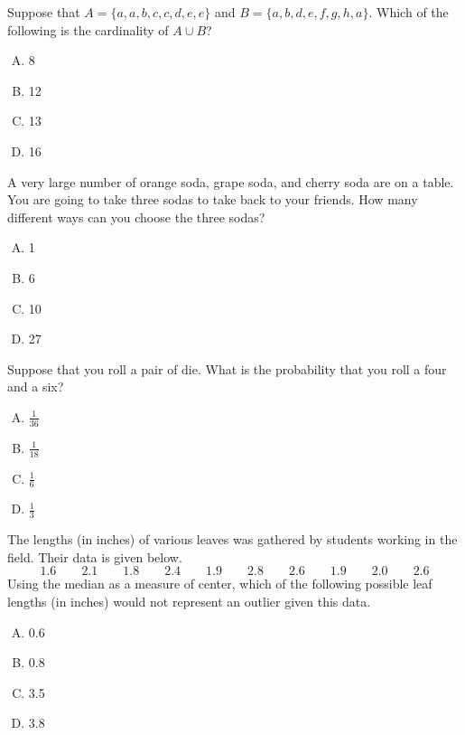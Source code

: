\documentclass[12pt,letterpaper]{exam}
\begin{document}
\begin{questions}
\vfill

\question Suppose that $A= \{ a, a, b, c, c, d, e, e \}$ and $B= \{ a, b, d, e, f, g, h, a \}$. Which of the following is the cardinality of $A \cup B$?
	\begin{enumerate}[A.]
	\item 8
	\item 12
	\item 13
	\item 16
	\end{enumerate}

\vfill

\question A very large number of orange soda, grape soda, and cherry soda are on a table. You are going to take three sodas to take back to your friends. How many different ways can you choose the three sodas?
	\begin{enumerate}[A.]
	\item 1
	\item 6
	\item 10
	\item 27
	\end{enumerate}

\vfill

\question Suppose that you roll a pair of die. What is the probability that you roll a four and a six?
	\begin{enumerate}[A.]
	\item $\frac{1}{36}$
	\item $\frac{1}{18}$
	\item $\frac{1}{6}$
	\item $\frac{1}{3}$
	\end{enumerate}

\vfill

\question The lengths (in inches) of various leaves was gathered by students working in the field. Their data is given below.
	\[
	1.6 \qquad 2.1 \qquad 1.8 \qquad 2.4 \qquad 1.9 \qquad 2.8 \qquad 2.6 \qquad 1.9 \qquad 2.0 \qquad 2.6
	\] 
Using the median as a measure of center, which of the following possible leaf lengths (in inches) would not represent an outlier given this data.
	\begin{enumerate}[A.]
	\item 0.6
	\item 0.8
	\item 3.5
	\item 3.8
	\end{enumerate}

\vfill


\end{questions}
\end{document}
